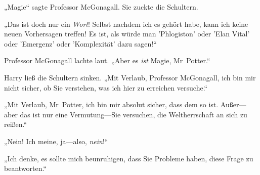 „Magie“ sagte Professor McGonagall. Sie zuckte die Schultern.

„Das ist doch nur ein \emph{Wort}! Selbst nachdem ich es gehört habe, kann ich keine neuen Vorhersagen treffen! Es ist, als würde man 'Phlogiston' oder 'Elan Vital' oder 'Emergenz' oder 'Komplexität' dazu sagen!“

Professor McGonagall lachte laut. „Aber es \emph{ist} Magie, Mr~Potter.“

Harry ließ die Schultern sinken. „Mit Verlaub, Professor McGonagall, ich bin mir nicht sicher, ob Sie verstehen, was ich hier zu erreichen versuche.“

„Mit Verlaub, Mr~Potter, ich bin mir absolut sicher, dass dem so ist. Außer—aber das ist nur eine Vermutung—Sie versuchen, die Weltherrschaft an sich zu reißen.“

„Nein! Ich meine, ja—also, \emph{nein}!“

„Ich denke, es sollte mich beunruhigen, dass Sie Probleme haben, diese Frage zu beantworten.“

